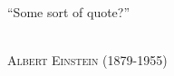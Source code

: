 \thispagestyle{empty}
\setlength{\epigraphwidth}{5.in}


\linespread{1.5}
\epigraph{\vspace{1.5in}\normalsize ``Some sort of quote?''}
  {\normalsize \textsc{\\Albert Einstein} (1879-1955)}







\newpage
\thispagestyle{empty}
\mbox{}




